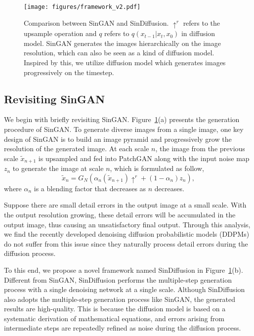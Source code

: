 \documentclass[10pt,twocolumn,letterpaper]{article}
\begin{document}
\begin{figure}[t]
  \centering
   \texttt{[image: figures/framework\_v2.pdf]}
   \vspace{-6mm}
   \caption{
   Comparison between SinGAN and SinDiffusion.
   $\uparrow^r$ refers to the upsample operation and $q$ refers to $q(x_{t-1} | x_t, x_0)$ in diffusion model.
   SinGAN generates the images hierarchically on the image resolution, which can also be seen as a kind of diffusion model.
   Inspired by this, we utilize diffusion model which generates images progressively on the timestep.
   }
   \vspace{-5mm}
   \label{fig:framework}
\end{figure}

\subsection{Revisiting SinGAN}
We begin with briefly revisiting SinGAN.
Figure~\ref{fig:framework}(a) presents the generation procedure of SinGAN.
To generate diverse images from a single image, one key design of SinGAN is to build an image pyramid and progressively grow the resolution of the generated image.
At each scale $n$, the image from the previous scale $\widetilde{x}_{n+1}$ is upsampled and fed into PatchGAN along with the input noise map $z_n$ to generate the image at scale $n$, which is formulated as follow,
\begin{equation}
    \widetilde{x}_{n} = G_{N}(\alpha_n(\widetilde{x}_{n+1})\uparrow^r + (1 - \alpha_n)z_n),
\end{equation}
where $\alpha_n$ is a blending factor that decreases as $n$ decreases.

Suppose there are small detail errors in the output image at a small scale. With the output resolution growing, these detail errors will be accumulated in the output image, thus causing an unsatisfactory final output. Through this analysis, we find the recently developed denoising diffusion probabilistic models (DDPMs)~\cite{ho2020denoising} do not suffer from this issue since they naturally process detail errors during the diffusion process.



To this end, we propose a novel framework named SinDiffusion in Figure~\ref{fig:framework}(b).
Different from SinGAN, SinDiffusion performs the multiple-step generation process with a single denoising network at a single scale.
Although SinDiffusion also adopts the multiple-step generation process like SinGAN, the generated results are high-quality. This is because the diffusion model is based on a systematic derivation of mathematical equations, and errors arising from intermediate steps are repeatedly refined as noise during the diffusion process.
\end{document}
